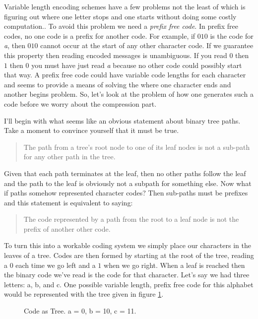 \documentclass[]{tufte-handout}
\begin{document}
Variable length encoding schemes have a few problems not the least of which is figuring out where one letter stops and one starts without doing some costly computation.. To avoid this problem we need a \textit{prefix free code}. In prefix free codes, no one code is a prefix for another code.  For example, if $010$ is the code for \textit{a}, then $010$ cannot occur at the start of any other character code. If we guarantee this property then reading encoded messages is unambiguous.  If you read $0$ then $1$ then $0$ you must have just read \textit{a} because no other code could possibly start that way. A prefix free code could have variable code lengths for each character and seems to provide a means of solving the where one character ends and another begins problem. So, let's look at the problem of how one generates such a code before we worry about the compression part. 

I'll begin with what seems like an obvious statement about binary tree paths. Take a moment to convince yourself that it must be true.
\begin{quote}
The path from a tree's root node to one of its leaf nodes is not a sub-path for any other path in the tree. 
\end{quote}
Given that each path terminates at the leaf, then no other paths follow the leaf and the path to the leaf is obviously not a subpath for something else. Now what if paths somehow represented character codes? Then sub-paths must be prefixes and this statement is equivalent to saying:
\begin{quote}
The code represented by a path from the root to a leaf node is not the prefix of another other code.  
\end{quote}
To turn this into a workable coding system we simply place our characters in the leaves of a tree. Codes are then formed by starting at the root of the tree, reading a $0$ each time we go left and a $1$ when we go right. When a leaf is reached then the binary code we've read is the code for that character. Let's say we had three letters: a, b, and c. One possible variable length, prefix free code for this alphabet would be represented with the tree given in figure \ref{fig:abc-var}.

\begin{figure}[!htbp]
\caption{Code as Tree. a = 0, b = 10, c = 11.}
\label{fig:abc-var}
\end{figure}
\end{document}
